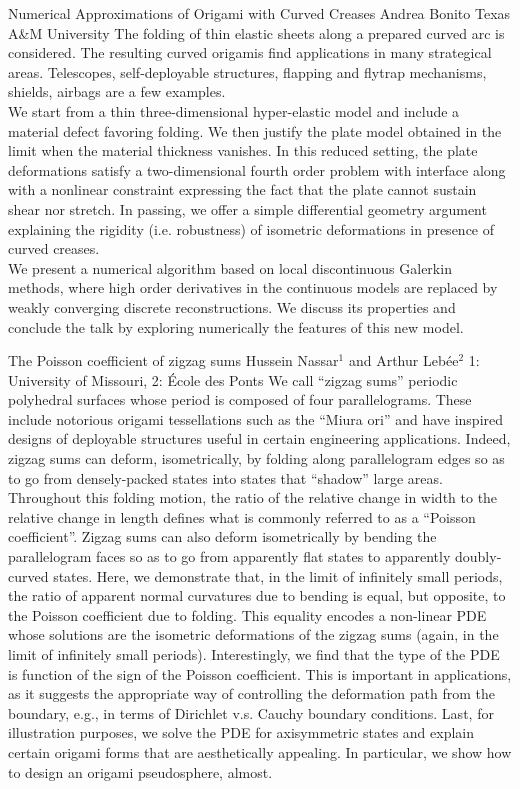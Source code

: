 \begin{addmargin}[2em]{0em}
\vspace{1.5ex}
\abs
{Numerical Approximations of Origami with Curved Creases}
{Andrea Bonito}
{Texas A\&M University}
{The folding of thin elastic sheets along a prepared curved arc is considered.  The resulting curved origamis find applications in many strategical areas. Telescopes, self-deployable structures, flapping and flytrap mechanisms, shields, airbags are a few examples.\\
We start from a thin three-dimensional hyper-elastic model and include a material defect favoring folding. We then justify the plate model obtained in the limit when the material thickness vanishes. In this reduced setting, the plate deformations satisfy a two-dimensional fourth order problem with interface along with a nonlinear constraint expressing the fact that the plate cannot sustain shear nor stretch.
In passing, we offer a simple differential geometry argument explaining the rigidity (i.e. robustness) of isometric deformations in presence of curved creases.\\
We present a numerical algorithm based on local discontinuous Galerkin methods, where high order derivatives in the continuous models are replaced by weakly converging discrete reconstructions. We discuss its properties and conclude the talk by exploring numerically the features of this new model.}


\vspace{1.5ex}
\abs
{The Poisson coefficient of zigzag sums}
{Hussein Nassar$^{1}$ and Arthur Leb\'ee$^{2}$}
{1: University of Missouri, 2: \'Ecole des Ponts}
{We call ``zigzag sums'' periodic polyhedral surfaces whose period is composed of four parallelograms. These include notorious origami tessellations such as the ``Miura ori'' and have inspired designs of deployable structures useful in certain engineering applications. Indeed, zigzag sums can deform, isometrically, by folding along parallelogram edges so as to go from densely-packed states into states that ``shadow'' large areas. Throughout this folding motion, the ratio of the relative change in width to the relative change in length defines what is commonly referred to as a ``Poisson coefficient''. Zigzag sums can also deform isometrically by bending the parallelogram faces so as to go from apparently flat states to apparently doubly-curved states. Here, we demonstrate that, in the limit of infinitely small periods, the ratio of apparent normal curvatures due to bending is equal, but opposite, to the Poisson coefficient due to folding. This equality encodes a non-linear PDE whose solutions are the isometric deformations of the zigzag sums (again, in the limit of infinitely small periods). Interestingly, we find that the type of the PDE is function of the sign of the Poisson coefficient. This is important in applications, as it suggests the appropriate way of controlling the deformation path from the boundary, e.g., in terms of Dirichlet v.s. Cauchy boundary conditions. Last, for illustration purposes, we solve the PDE for axisymmetric states and explain certain origami forms that are aesthetically appealing. In particular, we show how to design an origami pseudosphere, almost.
}



\end{addmargin}
